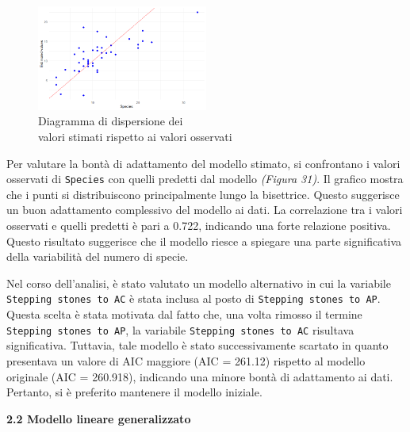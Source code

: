 \documentclass{article} %
\begin{document}
\begin{figure}[H]
    \centering
    \includegraphics[width=0.5\textwidth]{immagini/res_val_oss_lm.png}
    \captionsetup{justification=centering}
    \caption{Diagramma di dispersione dei \\valori stimati rispetto ai valori osservati}
\end{figure}

Per valutare la bontà di adattamento del modello stimato, si confrontano i valori osservati di \texttt{Species} con quelli predetti dal modello \textit{(Figura 31)}. Il grafico mostra che i punti si distribuiscono principalmente lungo la bisettrice. Questo suggerisce un buon adattamento complessivo del modello ai dati. La correlazione tra i valori osservati e quelli predetti è pari a 0.722, indicando una forte relazione positiva. Questo risultato suggerisce che il modello riesce a spiegare una parte significativa della variabilità del numero di specie.

Nel corso dell'analisi, è stato valutato un modello alternativo in cui la variabile \texttt{Stepping stones to AC} è stata inclusa al posto di \texttt{Stepping stones to AP}. Questa scelta è stata motivata dal fatto che, una volta rimosso il termine \texttt{Stepping stones to AP}, la variabile \texttt{Stepping stones to AC} risultava significativa. Tuttavia, tale modello è stato successivamente scartato in quanto presentava un valore di AIC maggiore (AIC = 261.12) rispetto al modello originale (AIC = 260.918), indicando una minore bontà di adattamento ai dati. Pertanto, si è preferito mantenere il modello iniziale.

\vskip 20pt
\begin{flushleft}
    \textbf{\Large 2.2 \: Modello lineare generalizzato}
\end{flushleft}
\vskip 10pt
\end{document}
